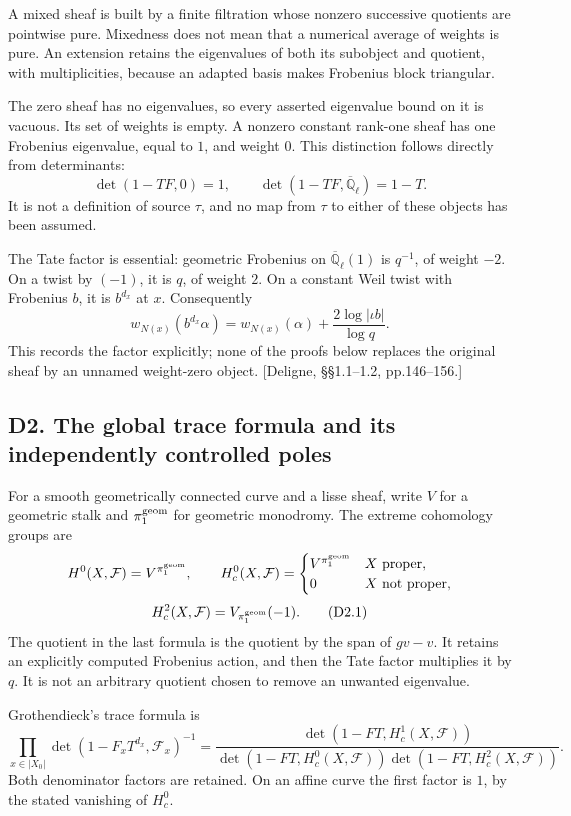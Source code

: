 A mixed sheaf is built by a finite filtration whose nonzero successive
quotients are pointwise pure. Mixedness does not mean that a numerical
average of weights is pure. An extension retains the eigenvalues of both
its subobject and quotient, with multiplicities, because an adapted
basis makes Frobenius block triangular.

The zero sheaf has no eigenvalues, so every asserted eigenvalue bound on
it is vacuous. Its set of weights is empty. A nonzero constant rank-one
sheaf has one Frobenius eigenvalue, equal to \(1\), and weight \(0\).
This distinction follows directly from determinants: \[
\det(1-TF,0)=1,\qquad
\det(1-TF,\overline{\mathbb Q}_\ell)=1-T.
\tag{D1.3}
\] It is not a definition of source \(\tau\), and no map from \(\tau\)
to either of these objects has been assumed.

The Tate factor is essential: geometric Frobenius on
\(\overline{\mathbb Q}_\ell(1)\) is \(q^{-1}\), of weight \(-2\). On a
twist by \((-1)\), it is \(q\), of weight \(2\). On a constant Weil
twist with Frobenius \(b\), it is \(b^{d_x}\) at \(x\). Consequently \[
w_{N(x)}(b^{d_x}\alpha)
=w_{N(x)}(\alpha)+\frac{2\log|\iota b|}{\log q}.
\tag{D1.4}
\] This records the factor explicitly; none of the proofs below replaces
the original sheaf by an unnamed weight-zero object. {[}Deligne,
§§1.1--1.2, pp.146--156.{]}

\subsection{D2. The global trace formula and its independently
controlled
poles}\label{d2.-the-global-trace-formula-and-its-independently-controlled-poles}

For a smooth geometrically connected curve and a lisse sheaf, write
\(V\) for a geometric stalk and \(\pi_1^{\rm geom}\) for geometric
monodromy. The extreme cohomology groups are \[
H^0(X,\mathcal F)=V^{\pi_1^{\rm geom}},
\qquad
H_c^0(X,\mathcal F)=
\begin{cases}
V^{\pi_1^{\rm geom}}&X\text{ proper},\\
0&X\text{ not proper},
\end{cases}
\] \[
H_c^2(X,\mathcal F)=V_{\pi_1^{\rm geom}}(-1).
\tag{D2.1}
\] The quotient in the last formula is the quotient by the span of
\(gv-v\). It retains an explicitly computed Frobenius action, and then
the Tate factor multiplies it by \(q\). It is not an arbitrary quotient
chosen to remove an unwanted eigenvalue.

Grothendieck's trace formula is \[
\prod_{x\in|X_0|}
\det(1-F_xT^{d_x},\mathcal F_x)^{-1}
=
\frac{\det(1-FT,H_c^1(X,\mathcal F))}
{\det(1-FT,H_c^0(X,\mathcal F))
 \det(1-FT,H_c^2(X,\mathcal F))}.
\tag{D2.2}
\] Both denominator factors are retained. On an affine curve the first
factor is \(1\), by the stated vanishing of \(H_c^0\).

